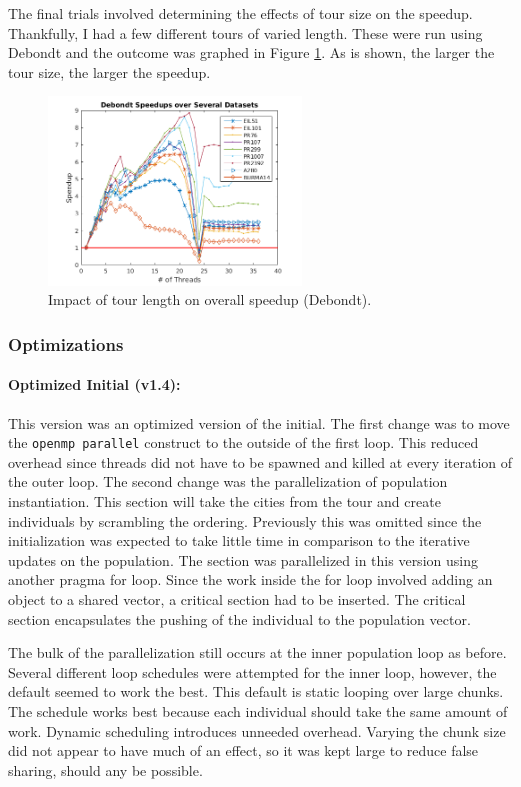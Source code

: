 \documentclass[10pt,letterpaper]{article}
\begin{document}
The final trials involved determining the effects of tour size on the speedup. Thankfully, I had a few different tours of varied length. These were run using Debondt and the outcome was graphed in Figure \ref{fig:tours}. As is shown, the larger the tour size, the larger the speedup. 

\begin{figure}
\centering
\includegraphics[width=0.6\textwidth]{../img/dataset_speedups.png} 
\caption{Impact of tour length on overall speedup (Debondt).}
\label{fig:tours}
\end{figure}

\subsubsection{Optimizations}
\paragraph{Optimized Initial (v1.4): } This version was an optimized version of the initial. The first change was to move the \texttt{openmp parallel} construct to the outside of the first loop. This reduced overhead since threads did not have to be spawned and killed at every iteration of the outer loop. The second change was the parallelization of population instantiation. This section will take the cities from the tour and create individuals by scrambling the ordering. Previously this was omitted since the initialization was expected to take little time in comparison to the iterative updates on the population. The section was parallelized in this version using another pragma for loop. Since the work inside the for loop involved adding an object to a shared vector, a critical section had to be inserted. The critical section encapsulates the pushing of the individual to the population vector. 

The bulk of the parallelization still occurs at the inner population loop as before. Several different loop schedules were attempted for the inner loop, however, the default seemed to work the best. This default is static looping over large chunks. The schedule works best because each individual should take the same amount of work. Dynamic scheduling introduces unneeded overhead. Varying the chunk size did not appear to have much of an effect, so it was kept large to reduce false sharing, should any be possible. 
\end{document}
